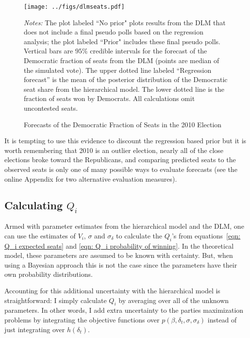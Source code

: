 \documentclass[12pt,final,fleqn]{article}
\theoremstyle{plain}
\begin{document}
\begin{figure}[!htb]
\centering
\texttt{[image: ../figs/dlmseats.pdf]}
\vspace{.5cm}
\caption{Forecasts of the Democratic Fraction of Seats in the 2010 Election}
\label{fig:Forecasts of the Democratic Fraction of Seats in the 2010 Election}
\begin{minipage}{\linewidth}
\footnotesize
\emph{Notes:} The plot labeled ``No prior" plots results from the DLM that does not include a final pseudo polls based on the regression analysis; the plot labeled ``Prior" includes these final pseudo polls. Vertical bars are $95\%$ credible intervals for the forecast of the Democratic fraction of seats from the DLM (points are median of the simulated vote). The upper dotted line labeled ``Regression forecast'' is the mean of the posterior distribution of the Democratic seat share from the hierarchical model. The lower dotted line is the fraction of seats won by Democrats. All calculations omit uncontested seats.
\end{minipage}
\end{figure}

It is tempting to use this evidence to discount the regression based prior but it is worth remembering that 2010 is an outlier election, nearly all of the close elections broke toward the Republicans, and comparing predicted seats to the observed seats is only one of many possible ways to evaluate forecasts (see the online Appendix for two alternative evaluation measures). 

\subsection{Calculating $Q_i$} \label{sec: calculating Q}
Armed with parameter estimates from the hierarchical model and the DLM, one can use the estimates of $V_{i}$, $\sigma$ and $\sigma_\delta$ to calculate the $Q_i$'s from equations~\ref{eqn: Q_i expected seats} and \ref{eqn: Q_i probability of winning}. In the theoretical model, these parameters are assumed to be known with certainty. But, when using a Bayesian approach this is not the case since the parameters have their own probability distributions. 

Accounting for this additional uncertainty with the hierarchical model is straightforward: I simply calculate $Q_i$ by averaging over all of the unknown parameters. In other words, I add extra uncertainty to the parties maximization problems by integrating the objective functions over $p(\beta, \delta_t, \sigma, \sigma_\delta)$ instead of just integrating over $h(\delta_t)$.
\end{document}
